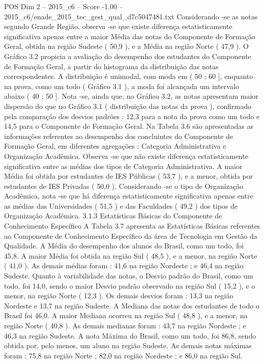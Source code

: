 \begin{textsample}{POS Dim 2 – 2015\_c6 – Score -1.00 – 2015\_c6/enade\_2015\_tec\_gest\_qual\_d7c5047481.txt}
Considerando -se as notas segundo Grande Região, observa -se que existe diferença estatisticamente significativa apenas entre a maior Média das notas do Componente de Formação Geral, obtida na região Sudeste ( 50,9 ), e a Média na região Norte ( 47,9 ).
O Gráfico 3.2 propicia a avaliação do desempenho dos estudantes do Componente de Formação Geral, a partir do histograma da distribuição das notas correspondentes.
A distribuição é unimodal, com moda em ( 50 ; 60 ], enquanto na prova, como um todo ( Gráfico 3.1 ), a moda foi alcançada um intervalo abaixo ( 40 ; 50 ].
Nota -se, ainda que, no Gráfico 3.2, as notas apresentam maior dispersão do que no Gráfico 3.1 ( distribuição das notas da prova ), confirmado pela comparação dos desvios padrões : 12,3 para a nota da prova como um todo e 14,5 para o Componente de Formação Geral.
Na Tabela 3.6 são apresentadas as informações referentes ao desempenho dos concluintes do Componente de Formação Geral, em diferentes agregações : Categoria Administrativa e Organização Acadêmica.
Observa -se que não existe diferença estatisticamente significativa entre as médias dos tipos de Categoria Administrativa.
A maior Média foi obtida por estudantes de IES Públicas ( 53,7 ), e a menor, obtida por estudantes de IES Privadas ( 50,0 ).
Considerando -se o tipo de Organização Acadêmica, nota -se que há diferença estatisticamente significativa apenas entre as médias das Universidades ( 51,5 ) e das Faculdades ( 49,2 ) dos tipos de Organização Acadêmica. 3.1.3 Estatísticas Básicas do Componente de Conhecimento Específico A Tabela 3.7 apresenta as Estatísticas Básicas referentes ao Componente de Conhecimento Específico da área de Tecnologia em Gestão da Qualidade.
A Média do desempenho dos alunos do Brasil, como um todo, foi 45,8.
A maior Média foi obtida na região Sul ( 48,5 ), e a menor, na região Norte ( 41,0 ).
As demais médias foram : 41,6 na região Nordeste ; e 46,4 na região Sudeste.
Quanto à variabilidade das notas, o Desvio padrão do Brasil, como um todo, foi 14,0, sendo o maior Desvio padrão observado na região Sul ( 15,2 ), e o menor, na região Norte ( 12,3 ).
Os demais desvios foram : 13,3 na região Nordeste e 13,7 na região Sudeste.
A Mediana das notas dos estudantes de todo o Brasil foi 46,0.
A maior Mediana ocorreu na região Sul ( 48,8 ), e a menor, na região Norte ( 40,8 ).
As demais medianas foram : 43,7 na região Nordeste ; e 46,3 na região Sudeste.
A nota Máxima do Brasil, como um todo, foi 86,8, sendo obtida por, pelo menos, um aluno na região Sudeste.
As demais notas máximas foram : 75,8 na região Norte ; 82,0 na região Nordeste ; e 86,0 na região Sul.

\end{textsample}
